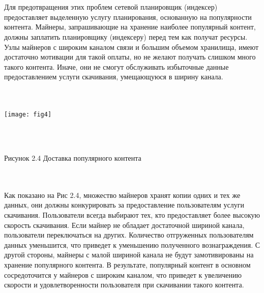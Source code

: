 \documentclass[10pt,a4paper]{article}
\begin{document}
\vspace{-0.5em}
\\ \\Для предотвращения этих проблем сетевой планировщик (индексер) предоставляет выделенную услугу планирования, основанную на популярности контента. Майнеры, запрашивающие на хранение наиболее популярный контент, должны заплатить планировщику (индексеру) перед тем как получат ресурсы. Узлы майнеров с широким каналом связи и большим объемом хранилища, имеют достаточно мотивации для такой оплаты, но не желают получать слишком много такого контента. Иначе, они не смогут обслуживать избыточные данные предоставлением услуги скачивания, умещающуюся в ширину канала.
\vspace{-0.7em}
 \\ \\\\
\centerline{\texttt{[image: fig4]}}
\\\\\centerline{{Рисунок 2.4 Доставка популярного контента}}
\vspace{-1.5em}
\\ \\ Как показано на Рис 2.4, множество майнеров хранят копии одних и тех же данных, они должны конкурировать за предоставление пользователям услуги скачивания. Пользователи всегда выбирают тех, кто предоставляет более высокую скорость скачивания. Если майнер не обладает достаточной шириной канала, пользователи переключаться на других. Количество отгруженных пользователям данных уменьшится, что приведет к уменьшению полученного вознаграждения. С другой стороны, майнеры с малой шириной канала не будут замотивированы на хранение популярного контента. В результате, популярный контент в основном сосредоточится у майнеров с широким каналом, что приведет к увеличению скорости и удовлетворенности пользователя при скачивании такого контента.
\vspace{-0.5em}
\end{document}
